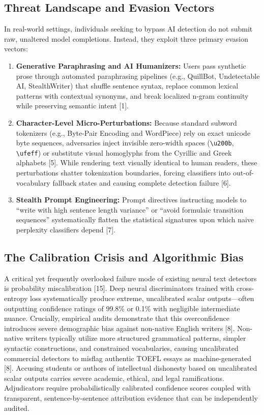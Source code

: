 \documentclass[conference]{IEEEtran}
\begin{document}
\subsection{Threat Landscape and Evasion Vectors}
In real-world settings, individuals seeking to bypass AI detection do not submit raw, unaltered model completions. Instead, they exploit three primary evasion vectors:
\begin{enumerate}
    \item \textbf{Generative Paraphrasing and AI Humanizers:} Users pass synthetic prose through automated paraphrasing pipelines (e.g., QuillBot, Undetectable AI, StealthWriter) that shuffle sentence syntax, replace common lexical patterns with contextual synonyms, and break localized n-gram continuity while preserving semantic intent [1].
    \item \textbf{Character-Level Micro-Perturbations:} Because standard subword tokenizers (e.g., Byte-Pair Encoding and WordPiece) rely on exact unicode byte sequences, adversaries inject invisible zero-width spaces (\texttt{\textbackslash u200b}, \texttt{\textbackslash ufeff}) or substitute visual homoglyphs from the Cyrillic and Greek alphabets [5]. While rendering text visually identical to human readers, these perturbations shatter tokenization boundaries, forcing classifiers into out-of-vocabulary fallback states and causing complete detection failure [6].
    \item \textbf{Stealth Prompt Engineering:} Prompt directives instructing models to ``write with high sentence length variance'' or ``avoid formulaic transition sequences'' systematically flatten the statistical signatures upon which naive perplexity classifiers depend [7].
\end{enumerate}

\subsection{The Calibration Crisis and Algorithmic Bias}
A critical yet frequently overlooked failure mode of existing neural text detectors is probability miscalibration [15]. Deep neural discriminators trained with cross-entropy loss systematically produce extreme, uncalibrated scalar outputs—often outputting confidence ratings of 99.8\% or 0.1\% with negligible intermediate nuance. Crucially, empirical audits demonstrate that this overconfidence introduces severe demographic bias against non-native English writers [8]. Non-native writers typically utilize more structured grammatical patterns, simpler syntactic constructions, and constrained vocabularies, causing uncalibrated commercial detectors to misflag authentic TOEFL essays as machine-generated [8]. Accusing students or authors of intellectual dishonesty based on uncalibrated scalar outputs carries severe academic, ethical, and legal ramifications. Adjudicators require probabilistically calibrated confidence scores coupled with transparent, sentence-by-sentence attribution evidence that can be independently audited.
\end{document}
